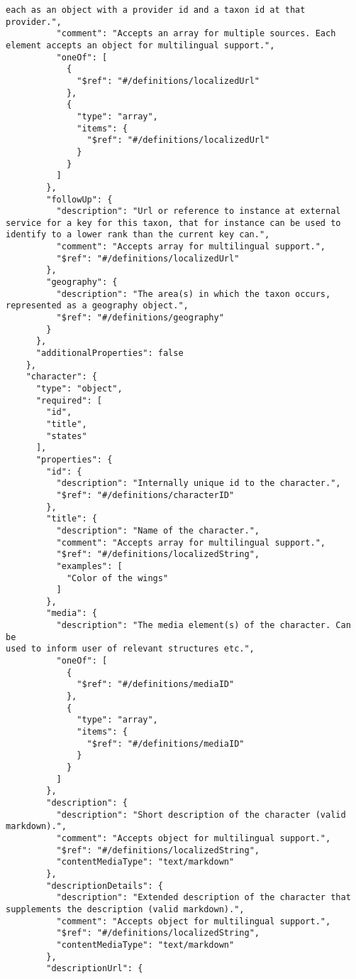 \documentclass[10pt,letterpaper]{article}
\begin{document}
\begin{verbatim}
each as an object with a provider id and a taxon id at that provider.",
          "comment": "Accepts an array for multiple sources. Each
element accepts an object for multilingual support.",
          "oneOf": [
            {
              "$ref": "#/definitions/localizedUrl"
            },
            {
              "type": "array",
              "items": {
                "$ref": "#/definitions/localizedUrl"
              }
            }
          ]
        },
        "followUp": {
          "description": "Url or reference to instance at external
service for a key for this taxon, that for instance can be used to
identify to a lower rank than the current key can.",
          "comment": "Accepts array for multilingual support.",
          "$ref": "#/definitions/localizedUrl"
        },
        "geography": {
          "description": "The area(s) in which the taxon occurs,
represented as a geography object.",
          "$ref": "#/definitions/geography"
        }
      },
      "additionalProperties": false
    },
    "character": {
      "type": "object",
      "required": [
        "id",
        "title",
        "states"
      ],
      "properties": {
        "id": {
          "description": "Internally unique id to the character.",
          "$ref": "#/definitions/characterID"
        },
        "title": {
          "description": "Name of the character.",
          "comment": "Accepts array for multilingual support.",
          "$ref": "#/definitions/localizedString",
          "examples": [
            "Color of the wings"
          ]
        },
        "media": {
          "description": "The media element(s) of the character. Can be
used to inform user of relevant structures etc.",
          "oneOf": [
            {
              "$ref": "#/definitions/mediaID"
            },
            {
              "type": "array",
              "items": {
                "$ref": "#/definitions/mediaID"
              }
            }
          ]
        },
        "description": {
          "description": "Short description of the character (valid
markdown).",
          "comment": "Accepts object for multilingual support.",
          "$ref": "#/definitions/localizedString",
          "contentMediaType": "text/markdown"
        },
        "descriptionDetails": {
          "description": "Extended description of the character that
supplements the description (valid markdown).",
          "comment": "Accepts object for multilingual support.",
          "$ref": "#/definitions/localizedString",
          "contentMediaType": "text/markdown"
        },
        "descriptionUrl": {

\end{verbatim}
\end{document}
